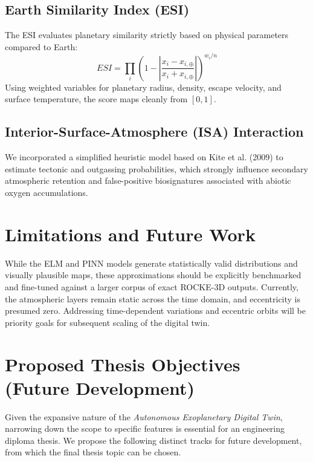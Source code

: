 \documentclass[12pt,a4paper]{article}
\begin{document}
\subsection{Earth Similarity Index (ESI)}
The ESI evaluates planetary similarity strictly based on physical parameters compared to Earth:
\begin{equation}
ESI = \prod_{i} \left(1 - \left|\frac{x_i - x_{i,\oplus}}{x_i + x_{i,\oplus}}\right|\right)^{w_i / n}
\end{equation}
Using weighted variables for planetary radius, density, escape velocity, and surface temperature, the score maps cleanly from $[0, 1]$.

\subsection{Interior-Surface-Atmosphere (ISA) Interaction}
We incorporated a simplified heuristic model based on Kite et al. (2009) to estimate tectonic and outgassing probabilities, which strongly influence secondary atmospheric retention and false-positive biosignatures associated with abiotic oxygen accumulations. 




\section{Limitations and Future Work}
While the ELM and PINN models generate statistically valid distributions and visually plausible maps,
these approximations should be explicitly benchmarked and fine-tuned against a larger corpus of exact ROCKE-3D outputs.
Currently, the atmospheric layers remain static across the time domain, and eccentricity is presumed zero.
Addressing time-dependent variations and eccentric orbits will be priority goals for subsequent scaling of the digital twin. 


\section{Proposed Thesis Objectives (Future Development)}
Given the expansive nature of the \textit{Autonomous Exoplanetary Digital Twin},
narrowing down the scope to specific features is essential for an engineering diploma thesis.
We propose the following distinct tracks for future development, from which the final thesis topic can be chosen.
\end{document}
